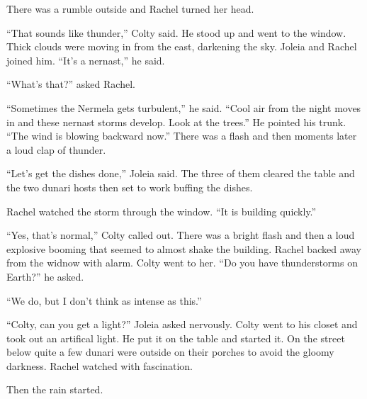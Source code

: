 
There was a rumble outside and Rachel turned her head.

``That sounds like thunder,'' Colty said. He stood up and went to the window. Thick clouds were
moving in from the east, darkening the sky. Joleia and Rachel joined him. ``It's a nernast,'' he
said.

``What's that?'' asked Rachel.

``Sometimes the Nermela gets turbulent,'' he said. ``Cool air from the night moves in and these
nernast storms develop. Look at the trees.'' He pointed his trunk. ``The wind is blowing
backward now.'' There was a flash and then moments later a loud clap of thunder.

``Let's get the dishes done,'' Joleia said. The three of them cleared the table and the two
dunari hosts then set to work buffing the dishes.

Rachel watched the storm through the window. ``It is building quickly.''

``Yes, that's normal,'' Colty called out. There was a bright flash and then a loud explosive
booming that seemed to almost shake the building. Rachel backed away from the widnow with alarm.
Colty went to her. ``Do you have thunderstorms on Earth?'' he asked.

``We do, but I don't think as intense as this.''

``Colty, can you get a light?'' Joleia asked nervously. Colty went to his closet and took out an
artifical light. He put it on the table and started it. On the street below quite a few dunari
were outside on their porches to avoid the gloomy darkness. Rachel watched with fascination.

Then the rain started.
